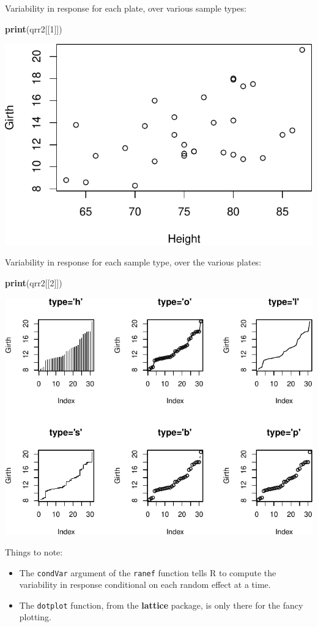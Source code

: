 \documentclass[]{book}
\newenvironment{Shaded}{\begin{snugshade}}{\end{snugshade}}
\newcommand{\DecValTok}[1]{\textcolor[rgb]{0.00,0.00,0.81}{#1}}
\newcommand{\KeywordTok}[1]{\textcolor[rgb]{0.13,0.29,0.53}{\textbf{#1}}}
\newcommand{\NormalTok}[1]{#1}
\providecommand{\tightlist}{%
  \setlength{\itemsep}{0pt}\setlength{\parskip}{0pt}}
\theoremstyle{definition}
\theoremstyle{definition}
\theoremstyle{definition}
\theoremstyle{remark}
\begin{document}
Variability in response for each plate, over various sample types:

\begin{Shaded}
\begin{Highlighting}[]
\KeywordTok{print}\NormalTok{(qrr2[[}\DecValTok{1}\NormalTok{]]) }
\end{Highlighting}
\end{Shaded}

\includegraphics[width=0.5\linewidth]{Rcourse_files/figure-latex/unnamed-chunk-206-1}

Variability in response for each sample type, over the various plates:

\begin{Shaded}
\begin{Highlighting}[]
\KeywordTok{print}\NormalTok{(qrr2[[}\DecValTok{2}\NormalTok{]])  }
\end{Highlighting}
\end{Shaded}

\includegraphics[width=0.5\linewidth]{Rcourse_files/figure-latex/unnamed-chunk-207-1}

Things to note:

\begin{itemize}
\tightlist
\item
  The \texttt{condVar} argument of the \texttt{ranef} function tells R to compute the variability in response conditional on each random effect at a time.
\item
  The \texttt{dotplot} function, from the \textbf{lattice} package, is only there for the fancy plotting.
\end{itemize}
\end{document}
